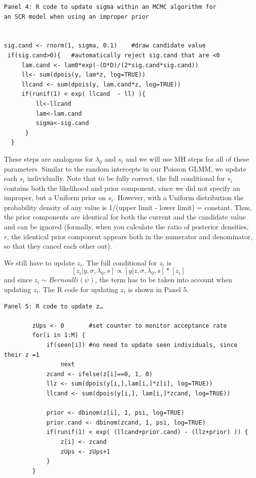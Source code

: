 {\small
\begin{verbatim}
Panel 4: R code to update sigma within an MCMC algorithm for
an SCR model when using an improper prior


sig.cand <- rnorm(1, sigma, 0.1)	#draw candidate value
 if(sig.cand>0){   #automatically reject sig.cand that are <0
     lam.cand <- lam0*exp(-(D*D)/(2*sig.cand*sig.cand))
     ll<- sum(dpois(y, lam*z, log=TRUE))
     llcand <- sum(dpois(y, lam.cand*z, log=TRUE))
     if(runif(1) < exp( llcand  - ll) ){
         ll<-llcand
         lam<-lam.cand
         sigma<-sig.cand
      }
  }

\end{verbatim}
}
These steps are analogous for  $\lambda_{0}$ and $s_i$ and we will use MH steps for
all of these parameters. Similar to the random intercepts in our
Poisson GLMM, we update each $s_i$ individually. Note that to be fully
correct, the full conditional for $s_i$ contains both the likelihood and
prior component, since we did not specify an improper, but a Uniform
prior on $s_i$. However, with a Uniform distribution the probability
density of any value is 1/(upper limit - lower limit) =
constant. Thus, the prior components are identical for both the
current and the candidate value and can be ignored (formally, when you
calculate the ratio of posterior densities, $r$, the identical prior
component appears both in the numerator and denominator, so that they
cancel each other out).

We still have to update $z_i$. The full conditional for $z_i$ is
\[
[z_i|y, \sigma, \lambda_0, s] \propto [y|z,\sigma, \lambda_0, s] * [z_i]
\]
and since $z_i \sim Bernoulli(\psi)$,
the term has to be taken into account when updating $z_i$. The R code for updating $z_i$ is shown in Panel 5.

{\small
\begin{verbatim}
Panel 5: R code to update z…

        zUps <- 0		#set counter to monitor acceptance rate
        for(i in 1:M) {
            if(seen[i])	#no need to update seen individuals, since their z =1
                next
            zcand <- ifelse(z[i]==0, 1, 0)
            llz <- sum(dpois(y[i,],lam[i,]*z[i], log=TRUE))
            llcand <- sum(dpois(y[i,], lam[i,]*zcand, log=TRUE))

            prior <- dbinom(z[i], 1, psi, log=TRUE)
            prior.cand <- dbinom(zcand, 1, psi, log=TRUE)
            if(runif(1) < exp( (llcand+prior.cand) - (llz+prior) )) {
                z[i] <- zcand
                zUps <- zUps+1
            }
        }
\end{verbatim}
}

